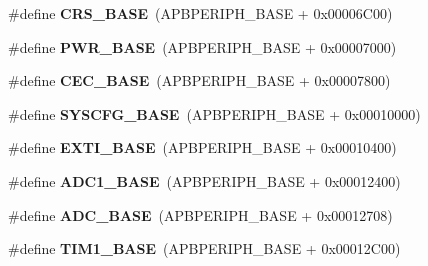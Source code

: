 \begin{DoxyCompactItemize}
\item 
\mbox{\label{group___peripheral__memory__map_ga53cd25310ec0663a7395042bd860fedc}} 
\#define {\bfseries C\+R\+S\+\_\+\+B\+A\+SE}~(A\+P\+B\+P\+E\+R\+I\+P\+H\+\_\+\+B\+A\+SE + 0x00006\+C00)
\item 
\mbox{\label{group___peripheral__memory__map_gac691ec23dace8b7a649a25acb110217a}} 
\#define {\bfseries P\+W\+R\+\_\+\+B\+A\+SE}~(A\+P\+B\+P\+E\+R\+I\+P\+H\+\_\+\+B\+A\+SE + 0x00007000)
\item 
\mbox{\label{group___peripheral__memory__map_gaacb77bc44b3f8c87ab98f241e760e440}} 
\#define {\bfseries C\+E\+C\+\_\+\+B\+A\+SE}~(A\+P\+B\+P\+E\+R\+I\+P\+H\+\_\+\+B\+A\+SE + 0x00007800)
\item 
\mbox{\label{group___peripheral__memory__map_ga62246020bf3b34b6a4d8d0e84ec79d3d}} 
\#define {\bfseries S\+Y\+S\+C\+F\+G\+\_\+\+B\+A\+SE}~(A\+P\+B\+P\+E\+R\+I\+P\+H\+\_\+\+B\+A\+SE + 0x00010000)
\item 
\mbox{\label{group___peripheral__memory__map_ga87371508b3bcdcd98cd1ec629be29061}} 
\#define {\bfseries E\+X\+T\+I\+\_\+\+B\+A\+SE}~(A\+P\+B\+P\+E\+R\+I\+P\+H\+\_\+\+B\+A\+SE + 0x00010400)
\item 
\mbox{\label{group___peripheral__memory__map_ga695c9a2f892363a1c942405c8d351b91}} 
\#define {\bfseries A\+D\+C1\+\_\+\+B\+A\+SE}~(A\+P\+B\+P\+E\+R\+I\+P\+H\+\_\+\+B\+A\+SE + 0x00012400)
\item 
\mbox{\label{group___peripheral__memory__map_gad06cb9e5985bd216a376f26f22303cd6}} 
\#define {\bfseries A\+D\+C\+\_\+\+B\+A\+SE}~(A\+P\+B\+P\+E\+R\+I\+P\+H\+\_\+\+B\+A\+SE + 0x00012708)
\item 
\mbox{\label{group___peripheral__memory__map_gaf8aa324ca5011b8173ab16585ed7324a}} 
\#define {\bfseries T\+I\+M1\+\_\+\+B\+A\+SE}~(A\+P\+B\+P\+E\+R\+I\+P\+H\+\_\+\+B\+A\+SE + 0x00012\+C00)
\item 
\mbox{\label{group___peripheral__memory__map_ga50cd8b47929f18b05efbd0f41253bf8d}} 

\end{DoxyCompactItemize}
